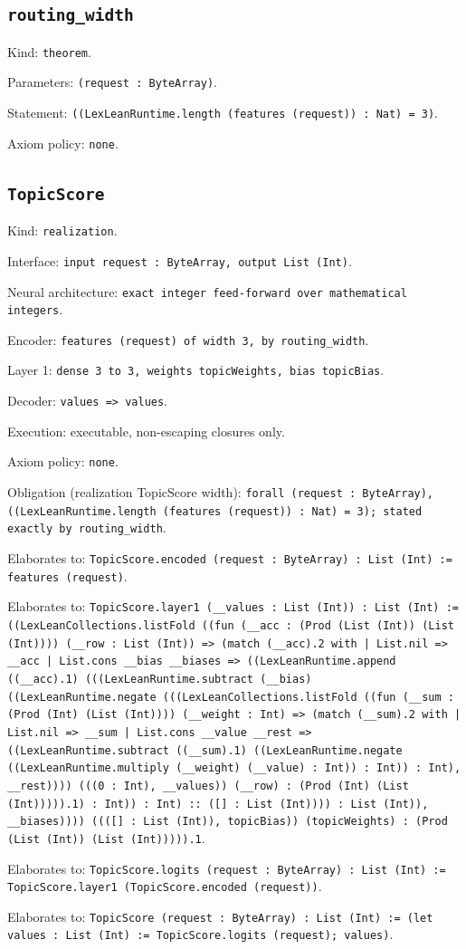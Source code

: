 \documentclass[11pt]{article}
\begin{document}
\subsection*{\texttt{routing\_width}}
\noindent Kind: \texttt{theorem}.\par
\noindent Parameters: \texttt{(request : ByteArray)}.\par
\noindent Statement: \texttt{((LexLeanRuntime.length (features (request)) : Nat) = 3)}.\par
\noindent Axiom policy: \texttt{none}.\par
\subsection*{\texttt{TopicScore}}
\noindent Kind: \texttt{realization}.\par
\noindent Interface: \texttt{input request : ByteArray, output List (Int)}.\par
\noindent Neural architecture: \texttt{exact integer feed-forward over mathematical integers}.\par
\noindent Encoder: \texttt{features (request) of width 3, by routing\_width}.\par
\noindent Layer 1: \texttt{dense 3 to 3, weights topicWeights, bias topicBias}.\par
\noindent Decoder: \texttt{values => values}.\par
\noindent Execution: executable, non-escaping closures only.\par
\noindent Axiom policy: \texttt{none}.\par
\noindent Obligation (realization TopicScore width): \texttt{forall (request : ByteArray), ((LexLeanRuntime.length (features (request)) : Nat) = 3); stated exactly by routing\_width}.\par
\noindent Elaborates to: \texttt{TopicScore.encoded (request : ByteArray) : List (Int) := features (request)}.\par
\noindent Elaborates to: \texttt{TopicScore.layer1 (\_\_values : List (Int)) : List (Int) := ((LexLeanCollections.listFold ((fun (\_\_acc : (Prod (List (Int)) (List (Int)))) (\_\_row : List (Int)) => (match (\_\_acc).2 with | List.nil => \_\_acc | List.cons \_\_bias \_\_biases => ((LexLeanRuntime.append ((\_\_acc).1) (((LexLeanRuntime.subtract (\_\_bias) ((LexLeanRuntime.negate (((LexLeanCollections.listFold ((fun (\_\_sum : (Prod (Int) (List (Int)))) (\_\_weight : Int) => (match (\_\_sum).2 with | List.nil => \_\_sum | List.cons \_\_value \_\_rest => ((LexLeanRuntime.subtract ((\_\_sum).1) ((LexLeanRuntime.negate ((LexLeanRuntime.multiply (\_\_weight) (\_\_value) : Int)) : Int)) : Int), \_\_rest)))) (((0 : Int), \_\_values)) (\_\_row) : (Prod (Int) (List (Int))))).1) : Int)) : Int) :: ([] : List (Int)))) : List (Int)), \_\_biases)))) ((([] : List (Int)), topicBias)) (topicWeights) : (Prod (List (Int)) (List (Int))))).1}.\par
\noindent Elaborates to: \texttt{TopicScore.logits (request : ByteArray) : List (Int) := TopicScore.layer1 (TopicScore.encoded (request))}.\par
\noindent Elaborates to: \texttt{TopicScore (request : ByteArray) : List (Int) := (let values : List (Int) := TopicScore.logits (request); values)}.\par
\end{document}
